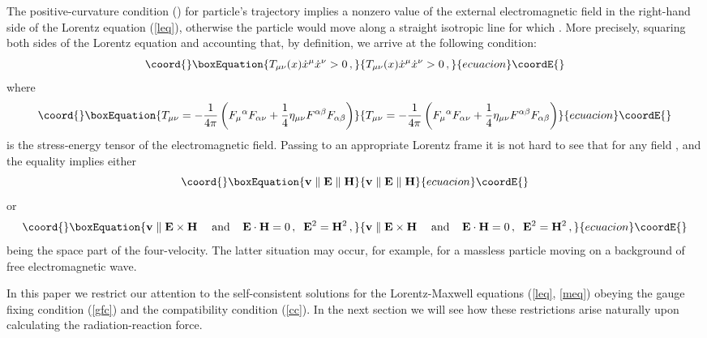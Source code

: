 \documentclass[a4paper,12pt]{article}
\begin{document}
The positive-curvature condition (\coordHE{}) for particle's
trajectory implies a nonzero value of the external electromagnetic
field in the right-hand side of the Lorentz equation (\ref{leq}),
otherwise the particle would move along a straight isotropic line
for which \coordHE{}. More precisely, squaring both sides
of the Lorentz equation and accounting that, by definition,
\coordHE{} we arrive at the following condition:
\begin{equation}\coord{}\boxEquation{\label{cc}
  T_{\mu\nu}(x)\dot{x}^\mu\dot{x}^\nu > 0\,,
}{T_{\mu\nu}(x)\dot{x}^\mu\dot{x}^\nu > 0\,,
}{ecuacion}\coordE{}\end{equation}
where
\begin{equation}\coord{}\boxEquation{\label{}
  T_{\mu\nu}=-\frac{1}{4\pi} \left( F_\mu{}^\alpha F_{\alpha\nu} +\frac14\eta_{\mu\nu}
  F^{\alpha\beta}F_{\alpha\beta} \right )
}{T_{\mu\nu}=-\frac{1}{4\pi} \left( F_\mu{}^\alpha F_{\alpha\nu} +\frac14\eta_{\mu\nu}
  F^{\alpha\beta}F_{\alpha\beta} \right )
}{ecuacion}\coordE{}\end{equation}
is the stress-energy tensor of the electromagnetic field. Passing
to an appropriate Lorentz frame it is not hard to see that
\coordHE{} for any field
\coordHE{}, and the equality implies
either
\begin{equation}\coord{}\boxEquation{\label{}
 \mathbf{v}\parallel \mathbf{E}\parallel\mathbf{H}
}{\mathbf{v}\parallel \mathbf{E}\parallel\mathbf{H}
}{ecuacion}\coordE{}\end{equation}
or
\begin{equation}\coord{}\boxEquation{\label{}
  \mathbf{v}\parallel \mathbf{E}\times\mathbf{H}\,\;\;\;\;
  {\rm and}\;\;\;\;\mathbf{E}\cdot \mathbf{H}=0\,,\;\;\mathbf{E}^2=\mathbf{H}^2\,,
}{\mathbf{v}\parallel \mathbf{E}\times\mathbf{H}\,\;\;\;\;
  {\rm and}\;\;\;\;\mathbf{E}\cdot \mathbf{H}=0\,,\;\;\mathbf{E}^2=\mathbf{H}^2\,,
}{ecuacion}\coordE{}\end{equation}
\coordHE{} being the space part of the
four-velocity. The latter situation may occur, for example, for a
massless particle moving on a background of free electromagnetic
wave.

In this paper we restrict our attention to the self-consistent
solutions for the Lorentz-Maxwell equations (\ref{leq}, \ref{meq})
obeying the gauge fixing condition (\ref{gfc}) and the
compatibility condition (\ref{cc}). In the next section we will
see how these restrictions arise naturally upon calculating the
radiation-reaction force.
\end{document}
